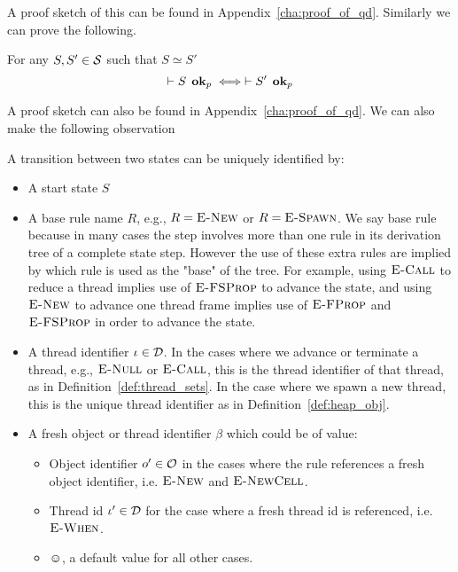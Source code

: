 A proof sketch of this can be found in Appendix~\ref{cha:proof_of_qd}.
Similarly we can prove the following. 
\begin{proposition} \label{prop:eqrel_stateok}
  For any $S, S' \in \mathcal{S}$ such that $S \simeq S'$
  \begin{equation}
    \vdash S \:\: \mbox{{\bf ok}$_p$} \iff \vdash S' \:\: \mbox{{\bf ok}$_p$}
  \end{equation}
\end{proposition}
A proof sketch can also be found in Appendix~\ref{cha:proof_of_qd}.
We can also make the following observation
\begin{claim}
  A transition between two states can be uniquely identified by:
  \begin{itemize}
    \item A start state $S$
    \item A base rule name $R$, e.g., $R = \mbox{{\sc E-New}}$ or $R = \mbox{\sc E-Spawn}$. We say base rule
      because in many cases the step involves more than one rule in its
      derivation tree of a complete state step. However the use of these extra
      rules are implied by which rule is used as the "base" of the tree. For
      example, using $\mbox{\sc E-Call}$ to reduce a thread implies use of $\mbox{\sc E-FSProp}$ to
      advance the state, and using $\mbox{{\sc E-New}}$ to advance one thread frame implies
      use of $\mbox{\sc E-FProp}$ and $\mbox{\sc E-FSProp}$ in order to advance the state.
    \item A thread identifier $\iota \in \mathcal{D}$. In the cases where we advance or terminate
      a thread, e.g., $\mbox{{\sc E-Null}}$ or $\mbox{\sc E-Call}$, this is the thread identifier of
      that thread, as in Definition~\ref{def:thread_sets}. In the case where we
      spawn a new thread, this is the unique thread identifier as in
      Definition~\ref{def:heap_obj}.
    \item A fresh object or thread identifier $\beta$ which could be of value:
      \begin{itemize}
        \item Object identifier $o' \in \mathcal{O}$ in the cases where the rule
          references a fresh object identifier, i.e. $\mbox{{\sc E-New}}$ and $\mbox{{\sc E-NewCell}}$.
        \item Thread id $\iota' \in \mathcal{D}$ for the case where a fresh thread id is
          referenced, i.e. $\mbox{{\sc E-When}}$.
        \item $\smiley$, a default value for all other cases.
      \end{itemize}
  \end{itemize}
\end{claim}

